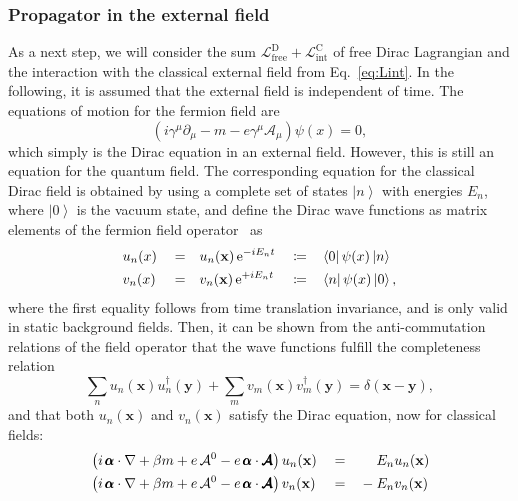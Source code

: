\subsubsection*{Propagator in the external field}
As a next step, we will consider the sum $\mathcal{L}_{\text{free}}^{\text{D}} + \mathcal{L}_{\text{int}}^{\text{C}}$ of free Dirac Lagrangian  and the interaction with the classical external field  from Eq.~\eqref{eq:Lint}. In the following, it is assumed that the external field is independent of time. The equations of motion for the fermion field are
\begin{equation}
\left( i \gamma^\mu \partial_\mu - m - e \gamma^\mu \mathcal{A}_\mu \right)
\psi(x) = 0,
\end{equation}
which simply is the Dirac equation in an external field. However, this is still an equation for the quantum field. The corresponding equation for the classical Dirac field is obtained by using a complete set of states $\left|n\right>$ with energies $E_n$, where $\left|0\right>$ is the vacuum state, and define the Dirac wave functions as matrix elements of the fermion field operator~\mbox{\cite[Section 14.1]{weinberg2005}} as
\begin{alignat}{5}
&u_n(x)&&=&&u_n(\mathbf{x})\,\text{e}^{-iE_nt}&&\coloneqq&&\left<0\right|\psi(x)\left|n\right>\notag\\
&v_n(x)&&=&&v_n(\mathbf{x})\,\text{e}^{+iE_nt}&&\coloneqq&&\left<n\right|\psi(x)\left|0\right>,
\label{eq:wavefct}
\end{alignat}
where the first equality follows from time translation invariance, and is only valid in static background fields. 
Then, it can be shown from the anti-commutation relations of the field operator that the wave functions fulfill the completeness relation
\begin{equation}
\sum_n u_n(\mathbf{x})u_n^\dagger(\mathbf{y}) + \sum_m v_m(\mathbf{x})v_m^\dagger(\mathbf{y})=\delta(\mathbf{x}-\mathbf{y}),
\end{equation}
and that both $u_n(\mathbf{x})$ and $v_n(\mathbf{x})$ satisfy the Dirac equation, now for classical fields:
\begin{alignat}{3}
& \left( i\,\pmb{\alpha} \cdot \mathbf{\nabla} + \beta m + e\, \mathcal{A}^0 - e\, \pmb{\alpha}\cdot \pmb{\mathcal{A}} \right) u_n(\mathbf{x}) &&=&& \phantom{-}\;\, E_n u_n(\mathbf{x}) \notag\\
& \left( i\,\pmb{\alpha} \cdot \mathbf{\nabla} + \beta m + e\, \mathcal{A}^0 - e\, \pmb{\alpha}\cdot \pmb{\mathcal{A}} \right) v_n(\mathbf{x}) &&=&& -E_n v_n(\mathbf{x})
\label{eq:diraceq}
\end{alignat}
